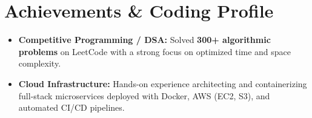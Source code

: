 \documentclass[a4paper,10pt]{article}
\begin{document}
\vspace{-3pt}

\section{Achievements \& Coding Profile}
\begin{itemize}[leftmargin=*, itemsep=1.5pt, parsep=0pt, topsep=1.5pt, partopsep=0pt]
    \item \textbf{Competitive Programming / DSA:} Solved \textbf{300+ algorithmic problems} on LeetCode with a strong focus on optimized time and space complexity.
    \item \textbf{Cloud Infrastructure:} Hands-on experience architecting and containerizing full-stack microservices deployed with Docker, AWS (EC2, S3), and automated CI/CD pipelines.
\end{itemize}
\end{document}
